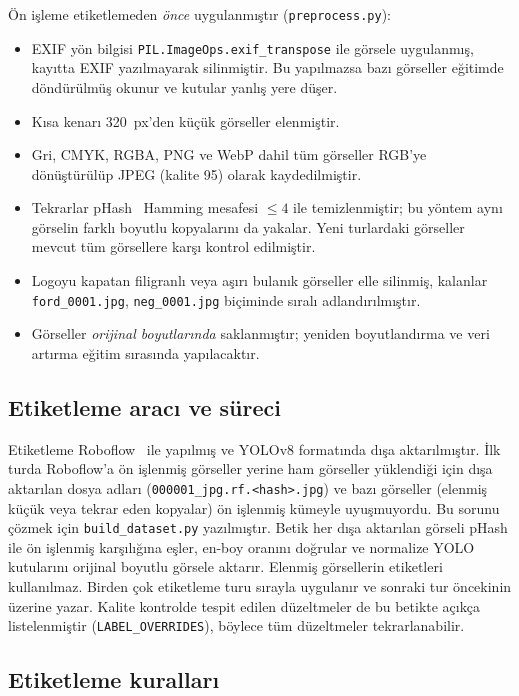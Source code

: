 \documentclass[conference]{IEEEtran}
\newcommand{\kod}[1]{\texttt{\small #1}}
\begin{document}
Ön işleme etiketlemeden \emph{önce} uygulanmıştır (\kod{preprocess.py}):
\begin{itemize}
\item EXIF yön bilgisi \kod{PIL.ImageOps.exif\_transpose} ile görsele uygulanmış, kayıtta EXIF
yazılmayarak silinmiştir. Bu yapılmazsa bazı görseller eğitimde döndürülmüş okunur ve kutular
yanlış yere düşer.
\item Kısa kenarı 320~px'den küçük görseller elenmiştir.
\item Gri, CMYK, RGBA, PNG ve WebP dahil tüm görseller RGB'ye dönüştürülüp JPEG (kalite 95)
olarak kaydedilmiştir.
\item Tekrarlar pHash~\cite{imagehash} Hamming mesafesi $\le 4$ ile temizlenmiştir; bu
yöntem aynı görselin farklı boyutlu kopyalarını da yakalar. Yeni turlardaki görseller mevcut
tüm görsellere karşı kontrol edilmiştir.
\item Logoyu kapatan filigranlı veya aşırı bulanık görseller elle silinmiş, kalanlar
\kod{ford\_0001.jpg}, \kod{neg\_0001.jpg} biçiminde sıralı adlandırılmıştır.
\item Görseller \emph{orijinal boyutlarında} saklanmıştır; yeniden boyutlandırma ve veri
artırma eğitim sırasında yapılacaktır.
\end{itemize}

\subsection{Etiketleme aracı ve süreci}

Etiketleme Roboflow~\cite{roboflow} ile yapılmış ve YOLOv8 formatında dışa aktarılmıştır.
İlk turda Roboflow'a ön işlenmiş görseller yerine ham görseller yüklendiği için dışa aktarılan
dosya adları (\kod{000001\_jpg.rf.<hash>.jpg}) ve bazı görseller (elenmiş küçük veya tekrar
eden kopyalar) ön işlenmiş kümeyle uyuşmuyordu. Bu sorunu çözmek için
\kod{build\_dataset.py} yazılmıştır. Betik her dışa aktarılan görseli pHash ile ön işlenmiş
karşılığına eşler, en-boy oranını doğrular ve normalize YOLO kutularını orijinal boyutlu
görsele aktarır. Elenmiş görsellerin etiketleri kullanılmaz. Birden çok etiketleme turu
sırayla uygulanır ve sonraki tur öncekinin üzerine yazar. Kalite kontrolde tespit edilen
düzeltmeler de bu betikte açıkça listelenmiştir (\kod{LABEL\_OVERRIDES}), böylece tüm
düzeltmeler tekrarlanabilir.

\subsection{Etiketleme kuralları}
\end{document}
